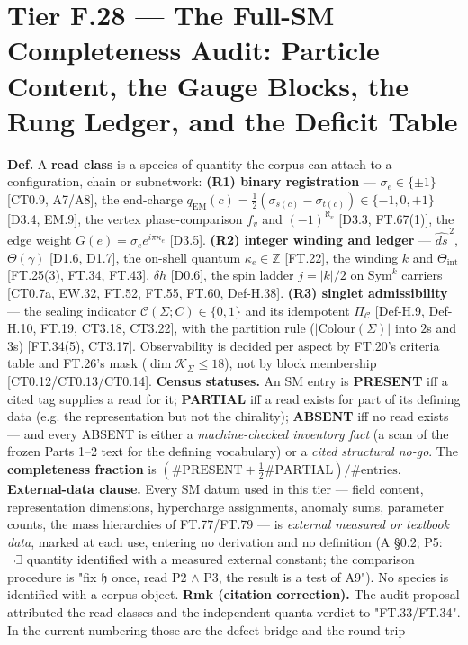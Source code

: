 \section[Tier F.28 — The Full-SM Completeness Audit: Particle…]{\texorpdfstring{Tier F.28 — The Full-SM Completeness Audit: Particle Content, the Gauge Blocks, the Rung Ledger, and the Deficit Table}{Tier F.28 - The Full-SM Completeness Audit: Particle Content, the Gauge Blocks, the Rung Ledger, and the Deficit Table}}

\begin{definition}\label{tag:Def-H-29}
\textbf{Def.} A \textbf{read class} is a species of quantity the corpus can attach to a configuration, chain or subnetwork: \textbf{(R1) binary registration} — $\sigma_e\in\{\pm1\}$ [CT0.9, A7/A8], the end-charge $q_{\mathrm{EM}}(c)=\tfrac12(\sigma_{s(c)}-\sigma_{t(c)})\in\{-1,0,+1\}$ [D3.4, EM.9], the vertex phase-comparison $f_v$ and $(-1)^{\aleph_v}$ [D3.3, FT.67(1)], the edge weight $G(e)=\sigma_e e^{i\pi\kappa_e}$ [D3.5]. \textbf{(R2) integer winding and ledger} — $\widehat{ds}^{\,2}$, $\Theta(\gamma)$ [D1.6, D1.7], the on-shell quantum $\kappa_e\in\mathbb Z$ [FT.22], the winding $k$ and $\Theta_{\mathrm{int}}$ [FT.25(3), FT.34, FT.43], $\delta h$ [D0.6], the spin ladder $j=|k|/2$ on $\mathrm{Sym}^k$ carriers [CT0.7a, EW.32, FT.52, FT.55, FT.60, Def-H.38]. \textbf{(R3) singlet admissibility} — the sealing indicator $\mathcal C(\Sigma;C)\in\{0,1\}$ and its idempotent $\Pi_{\mathcal C}$ [Def-H.9, Def-H.10, FT.19, CT3.18, CT3.22], with the partition rule ($|\mathrm{Colour}(\Sigma)|$ into $2$s and $3$s) [FT.34(5), CT3.17]. Observability is decided per aspect by FT.20's criteria table and FT.26's mask ($\dim\mathcal K_\Sigma\le18$), not by block membership [CT0.12/CT0.13/CT0.14]. \textbf{Census statuses.} An SM entry is \textbf{PRESENT} iff a cited tag supplies a read for it; \textbf{PARTIAL} iff a read exists for part of its defining data (e.g. the representation but not the chirality); \textbf{ABSENT} iff no read exists — and every ABSENT is either a \textit{machine-checked inventory fact} (a scan of the frozen Parts 1–2 text for the defining vocabulary) or a \textit{cited structural no-go}. The \textbf{completeness fraction} is $(\#\mathrm{PRESENT}+\tfrac12\#\mathrm{PARTIAL})/\#\mathrm{entries}$. \textbf{External-data clause.} Every SM datum used in this tier — field content, representation dimensions, hypercharge assignments, anomaly sums, parameter counts, the mass hierarchies of FT.77/FT.79 — is \textit{external measured or textbook data}, marked at each use, entering no derivation and no definition (A §0.2; P5: $\neg\exists$ quantity identified with a measured external constant; the comparison procedure is "fix $\mathfrak h$ once, read P2 $\wedge$ P3, the result is a test of A9"). No species is identified with a corpus object. \textbf{Rmk (citation correction).} The audit proposal attributed the read classes and the independent-quanta verdict to "FT.33/FT.34". In the current numbering those are the defect bridge and the round-trip 
\end{definition}
